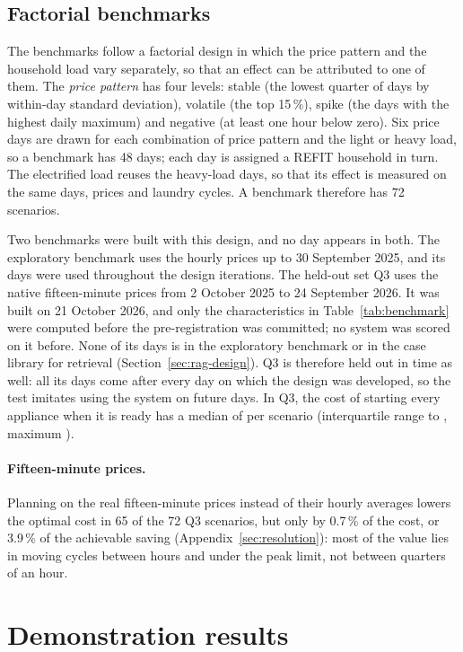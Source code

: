 \documentclass[12pt,a4paper]{report}
\begin{document}
\subsection{Factorial benchmarks}
\label{sec:factorial}

The benchmarks follow a factorial design in which the price pattern and
the household load vary separately, so that an effect can be attributed
to one of them. The \emph{price pattern} has four levels: stable (the
lowest quarter of days by within-day standard deviation), volatile (the
top 15\,\%), spike (the days with the highest daily maximum) and
negative (at least one hour below zero). Six price days are drawn for
each combination of price pattern and the light or heavy load, so a
benchmark has 48 days; each day is assigned a REFIT household in turn.
The electrified load reuses the heavy-load days, so that its effect is
measured on the same days, prices and laundry cycles. A benchmark
therefore has 72 scenarios.

Two benchmarks were built with this design, and no day appears in both.
The exploratory benchmark uses the hourly prices up to 30 September
2025, and its days were used throughout the design iterations. The
held-out set Q3 uses the native fifteen-minute prices from 2 October
2025 to 24 September 2026. It was built on 21 October 2026, and only
the characteristics in Table~\ref{tab:benchmark} were computed before
the pre-registration was committed; no system was scored on it before.
None of its days is in the exploratory benchmark or in the case library
for retrieval (Section~\ref{sec:rag-design}). Q3 is therefore held out
in time as well: all its days come after every day on which the design
was developed, so the test imitates using the system on future days. In
Q3, the cost of starting every appliance when it is ready has a median
of  per scenario (interquartile range  to
, maximum ).

\paragraph{Fifteen-minute prices.} Planning on the real fifteen-minute
prices instead of their hourly averages lowers the optimal cost in 65
of the 72 Q3 scenarios, but only by 0.7\,\% of the cost, or 3.9\,\% of
the achievable saving (Appendix~\ref{sec:resolution}): most of the value
lies in moving cycles between hours and under the peak limit, not
between quarters of an hour.

\section{Demonstration results}
\label{sec:demonstration}
\end{document}

